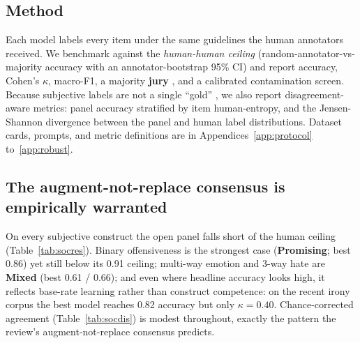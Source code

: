 \subsection{Method}
Each model labels every item under the same guidelines the human annotators received. We benchmark against the
\emph{human-human ceiling} (random-annotator-vs-majority accuracy with an annotator-bootstrap 95\% CI) and report
accuracy, Cohen's $\kappa$, macro-F1, a majority \textbf{jury} \citep{verga2024poll}, and a calibrated contamination
screen. Because subjective labels are not a single ``gold'' \citep{aroyo2015truth,plank2022humanlabel}, we also
report disagreement-aware metrics: panel accuracy stratified by item human-entropy, and the Jensen-Shannon
divergence between the panel and human label distributions. Dataset cards, prompts, and metric definitions are in
Appendices~\ref{app:protocol} to~\ref{app:robust}.

\subsection{The augment-not-replace consensus is empirically warranted}
On every subjective construct the open panel falls short of the human ceiling (Table~\ref{tab:socres}). Binary
offensiveness is the strongest case (\textbf{Promising}; best 0.86) yet still below its 0.91 ceiling; multi-way
emotion and 3-way hate are \textbf{Mixed} (best 0.61 / 0.66); and even where headline accuracy looks high, it
reflects base-rate learning rather than construct competence: on the recent irony corpus the best model reaches 0.82
accuracy but only $\kappa{=}0.40$. Chance-corrected agreement (Table~\ref{tab:socdis}) is modest throughout, exactly
the pattern the review's augment-not-replace consensus predicts.

\begin{table}[t]\centering\small
\caption{Study 2. Open panel vs the human-human ceiling on \SOCndat{} subjective social-computing datasets. Ceiling
= random-annotator-vs-majority accuracy; macro-F1 is the best model's chance-corrected score.}
\label{tab:socres}

\end{table}

